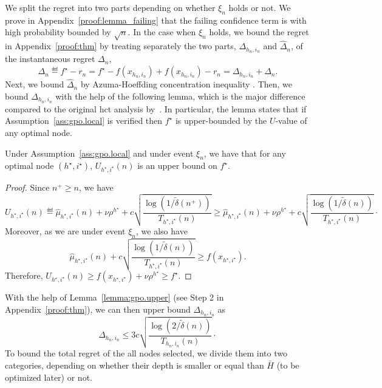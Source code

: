 We split the regret into two parts depending on whether $\xi_n$ holds or not. We prove in Appendix~\ref{proof:lemma_failing} that the failing confidence term is with high probability bounded by $\sqrt{n}$. In the case when $\xi_n$ holds, we bound the regret in Appendix~\ref{proof:thm}
by treating separately the two parts, $\Delta_{h_n,i_n}$ and $\hat{\Delta}_n$, of the instantaneous regret $\Delta_n$,
\[
\Delta_n \eqdef f^\star - r_n = f^\star - f(x_{h_n,i_n}) + f(x_{h_n,i_n}) - r_n = \Delta_{h_n,i_n} + \hat{\Delta}_n.
\]
Next, we bound $ \hat{\Delta}_n$ by Azuma-Hoeffding concentration inequality \citep{azuma1967}.
Then, we bound $ \Delta_{h_n,i_n}$  with the help of the following lemma, which is the major difference compared to the original \gls{hct} analysis by~\cite{azar2014online}. In particular, the lemma states that
if Assumption~\ref{ass:gpo.local} is verified then
 $f^\star$ is upper-bounded by the $U$-value of any optimal node.
\begin{lemma}\label{lemma:gpo.upper}
\begin{leftbar}[lemmabar]
Under Assumption~\ref{ass:gpo.local} and under event $\xi_n$, we have that for any optimal node $(h^\star,i^\star)$, $U_{h^\star,i^\star}(n)$ is an upper bound on $f^\star$.
\end{leftbar}
\end{lemma}

\begin{proof}
Since $n^+ \geq n$, we have
\[
	U_{h^\star,i^\star}(n) \eqdef \hat{\mu}_{h^\star,i^\star}(n) + \nu\rho^{h^\star} + c\sqrt{\frac{\operatorname{log}(1/\tilde{\delta}(n^+))}{T_{h^\star,i^\star}(n)}} \geq \hat{\mu}_{h^\star,i^\star}(n) + \nu\rho^{h^\star} + c\sqrt{\frac{\operatorname{log}(1/\tilde{\delta}(n))}{T_{h^\star,i^\star}(n)}}\cdot
\]
Moreover, as we are under event $\xi_n$, we also have
\[
	\hat{\mu}_{h^\star,i^\star}(n) + c\sqrt{\frac{\operatorname{log}(1/\tilde{\delta}(n))}{T_{h^\star,i^\star}(n)}} \geq f\left(x_{h^\star,i^\star}\right).
\]
Therefore, $U_{h^\star,i^\star}(n) \geq f(x_{h^\star,i^\star}) + \nu\rho^{h^\star} \geq f^\star$.
\end{proof}
\noindent With the help of Lemma~\ref{lemma:gpo.upper} (see Step 2 in Appendix~\ref{proof:thm}), we can then upper bound $\Delta_{h_n,i_n}$ as
\[
\Delta_{h_n,i_n} \leq 3c\sqrt{\frac{\operatorname{log}(2/\tilde{\delta}(n))}{T_{h_n,i_n}(n)}}\cdot%
\]
To bound the total regret of the all nodes selected, we divide them
into two categories, depending on whether their depth is smaller or equal than $\bar H$
(to be optimized later) or not.

